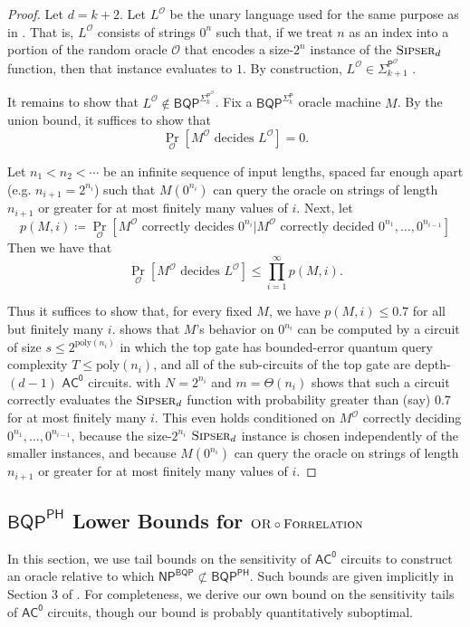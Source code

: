 \documentclass[11pt]{article}%
\newcommand{\poly}{\mathrm{poly}}
\newcommand{\Sipser}{\normalfont\textsc{Sipser}}
\newcommand{\OR}{\normalfont\textsc{OR}}
\newcommand{\Forrelation}{\normalfont\textsc{Forrelation}}
\begin{document}
\begin{proof}
Let $d = k + 2$. Let $L^\mathcal{O}$ be the unary language used for the same purpose as in \cite{RST15,HRST17}. That is, $L^\mathcal{O}$ consists of strings $0^n$ such that, if we treat $n$ as an index into a portion of the random oracle $\mathcal{O}$ that encodes a size-$2^n$ instance of the $\Sipser_{d}$ function, then that instance evaluates to $1$. By construction, $L^\mathcal{O} \in \mathsf{\Sigma}_{k+1}^{\mathsf{P}^\mathcal{O}}$ \cite{RST15,HRST17}.

It remains to show that $L^\mathcal{O} \not\in \mathsf{BQP}^{\mathsf{\Sigma}_k^{\mathsf{P}^\mathcal{O}}}$. Fix a $\mathsf{BQP}^{\mathsf{\Sigma}_k^{\mathsf{P}}}$ oracle machine $M$. By the union bound, it suffices to show that
\[
\Pr_{\mathcal{O}}\left[M^\mathcal{O} \text{ decides } L^\mathcal{O}\right]=0.
\]

Let $n_1<n_2<\cdots$ be an infinite sequence of input lengths, spaced far enough apart (e.g. $n_{i+1}=2^{n_i}$) such that $M\left(0^{n_i}\right)$ can query the oracle on strings of length $n_{i+1}$ or greater for at most finitely many values of $i$. Next, let
\[
p(M,i)\coloneqq\Pr_{\mathcal{O}}\left[M^\mathcal{O} \text{ correctly decides } 0^{n_i}|M^\mathcal{O} \text{ correctly decided }0^{n_1},\dots,0^{n_{i-1}}\right]
\]
Then we have that
\[
\Pr_{\mathcal{O}}\left[M^\mathcal{O}\text{ decides }L^\mathcal{O}\right]\leq\prod_{i=1}^\infty p(M,i).
\]

\noindent Thus it suffices to show that, for every fixed $M$, we have $p(M,i)\leq 0.7$ for all but finitely many $i$.  shows that $M$'s behavior on $0^{n_i}$ can be computed by a circuit of size $s \le 2^{\poly(n_i)}$ in which the top gate has bounded-error quantum query complexity $T \le \poly(n_i)$, and all of the sub-circuits of the top gate are depth-$(d-1)$ $\mathsf{AC^0}$ circuits.  with $N = 2^{n_i}$ and $m = \Theta(n_i)$ shows that such a circuit correctly evaluates the $\Sipser_d$ function with probability greater than (say) $0.7$ for at most finitely many $i$. This even holds conditioned on $M^\mathcal{O}$ correctly deciding $0^{n_1},\ldots,0^{n_{i-1}}$, because the size-$2^{n_i}$ $\Sipser_d$ instance is chosen independently of the smaller instances, and because $M\left(0^{n_i}\right)$ can query the oracle on strings of length $n_{i+1}$ or greater for at most finitely many values of $i$.
\end{proof}

\subsection{\texorpdfstring{$\mathsf{BQP}^{\mathsf{PH}}$}{BQP\^{}PH} Lower Bounds for \texorpdfstring{$\OR \circ \Forrelation$}{OR of FORRELATIONs}}
\label{sec:implications_of_ac0_concentration}
In this section, we use tail bounds on the sensitivity of $\mathsf{AC^0}$ circuits to construct an oracle relative to which $\mathsf{NP}^\mathsf{BQP} \not\subset \mathsf{BQP}^\mathsf{PH}$. Such bounds are given implicitly in Section 3 of \cite{GSTW16}. For completeness, we derive our own bound on the sensitivity tails of $\mathsf{AC^0}$ circuits, though our bound is probably quantitatively suboptimal.
\end{document}

